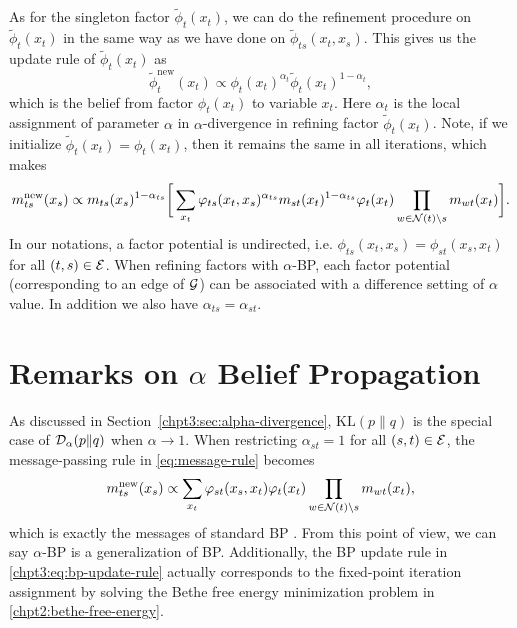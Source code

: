 As for the singleton factor $\tilde{\phi}_t(x_t)$, we can do the refinement procedure on $\tilde{\phi}_t(x_t)$ in the same way as we have done on $\tilde{\phi}_{ts}(x_t, x_s)$. This gives us the update rule of $\tilde{\phi}_t(x_t)$ as
\begin{equation}\label{eq:fix-factor-update}
  \tilde{\phi}_t^{\mathrm{new}}(x_t) \propto \phi_t(x_t)^{\alpha_{t}} \tilde{\phi}_t(x_t)^{1-\alpha_{t}},
\end{equation}
which is the belief from factor $\phi_t(x_t)$ to variable $x_t$. Here $\alpha_t$ is the local assignment of parameter $\alpha$ in $\alpha$-divergence in refining factor $\tilde{\phi}_t(x_t)$. Note, if
we initialize $\tilde{\phi}_t(x_t) = \phi_t(x_t)$, then it remains the
same in all iterations, which makes
\begin{align}\label{eq:message-rule}
  {m}^{\mathrm{new}}_{ts}(x_s) \propto
  m_{ts}(x_s)^{1-\alpha_{ts}} \bigg[\sum_{x_t} \varphi_{ts}(x_t, x_s)^{\alpha_{ts}} {m}_{st}(x_t)^{1-\alpha_{ts}} {\varphi}_t(x_t) \prod_{w\in \mathcal{N}(t)\backslash s}m_{wt}(x_t) \bigg].
\end{align}
In our notations, a factor potential is undirected, i.e. $\phi_{ts}(x_t, x_s)=\phi_{st}(x_s, x_t)$ for all $(t,s) \in \mathcal{E}$. When refining factors with $\alpha$-BP, each factor potential (corresponding to an edge of $\mathcal{G}$) can be associated with a difference setting of $\alpha$ value. In addition we also have $\alpha_{ts} = \alpha_{st}$.

\section{Remarks on $\alpha$ Belief Propagation}\label{subsec:remark}

As discussed in Section~\ref{chpt3:sec:alpha-divergence}, $\mathrm{KL}(p\|q)$ is the special case of $\mathcal{D}_{\alpha}(p\|q)$ when $\alpha \rightarrow 1$. When restricting $\alpha_{st}=1$ for all $(s,t) \in \mathcal{E}$, the message-passing rule in \eqref{eq:message-rule} becomes
\begin{equation}\label{chpt3:eq:bp-update-rule}
  {m}^{\text{new}}_{ts}(x_s) \propto 
  \sum_{x_t} \varphi_{st}(x_s, x_t) {\varphi}_t(x_t) \prod_{w\in \mathcal{N}(t)\backslash s}m_{wt}(x_t),
\end{equation}
which is exactly the messages of standard BP \cite{Bishop:2006:PRM:1162264}. From this point of view, we can say $\alpha$-BP is a generalization of BP. Additionally, the BP update rule in \eqref{chpt3:eq:bp-update-rule} actually corresponds to the fixed-point iteration assignment by solving the Bethe free energy minimization problem in \eqref{chpt2:bethe-free-energy}.


